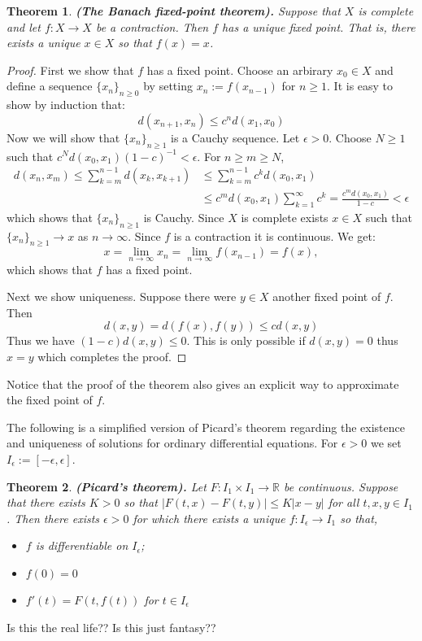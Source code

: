 \documentclass[11pt,a4paper]{article}
\theoremstyle{definition}
\theoremstyle{plain}
\newtheorem{theorem}{Theorem}[section]
\newcommand{\R}{\mathbb{R}}
\newcommand{\abs}[1]{\left\lvert #1\right\rvert}
\renewcommand{\tt}[1]{\textnormal{\textbf{(#1).}}} %
\begin{document}
	\begin{theorem}
		\tt{The Banach fixed-point theorem}
		Suppose that $X$ is complete
		and let $f \colon X \to X$ be a contraction. Then $f$ has a unique fixed 
		point. That is, there exists a unique $x \in X$ so that $f(x) = x$.
	\end{theorem}
	\begin{proof}
		First we show that $f$ has a fixed point. Choose an arbirary $x_0 \in X$
		and define a sequence $\{x_n\}_{n \geq 0}$ by setting
		$x_n := f(x_{n-1})$ for $n \geq 1$. It is easy to show by induction
		that:
		\[
			d(x_{n+1},x_{n}) \le c^n d(x_1,x_0)
		\]
		Now we will show that $\{x_n\}_{n \geq 1}$ is a Cauchy sequence.
		Let $\epsilon > 0$. Choose $N \geq 1$ such that
		$c^N d(x_0,x_1) (1-c)^{-1} < \epsilon$. For $n \geq m \geq N$,
		\begin{align*}
			d(x_n,x_m) \le 
			\sum_{k=m}^{n-1}{d(x_{k},x_{k+1})} &\le 
			\sum_{k=m}^{n-1}{c^k d(x_{0},x_{1})} \\ &\le
			c^m d(x_0,x_1) \sum_{k=1}^{\infty}{c^k} =
			\frac{c^m d(x_0,x_1)}{1-c} < \epsilon
		\end{align*}
		which shows that $\{x_n\}_{n \geq 1}$ is Cauchy. Since $X$ is complete
		exists $x \in X$ such that $\{x_n\}_{n \geq 1} \to x$ as $n \to \infty$.
		Since $f$ is a contraction it is continuous. We get:
		\[
			x = \lim_{n\to\infty}{x_n} = \lim_{n \to \infty}{f(x_{n-1})} = f(x),
		\]
		which shows that $f$ has a fixed point.
		
		Next we show uniqueness. Suppose there were $y \in X$ another fixed
		point of $f$. Then
		\[
			d(x,y) = d(f(x),f(y)) \le cd(x,y)
		\]
		Thus we have $(1-c)d(x,y) \le 0$. This is only possible if $d(x,y)=0$
		thus $x=y$ which completes the proof.
	\end{proof}
	Notice that the proof of the theorem also gives an explicit way to 
	approximate the fixed point of $f$.
	
	The following is a simplified version of Picard's theorem regarding the 
	existence and uniqueness of solutions for ordinary differential equations. 	
	For $\epsilon > 0$ we set $I_\epsilon := [-\epsilon, \epsilon]$.
	\begin{theorem}
		\tt{Picard's theorem}
		Let $F \colon I_1 \times I_1 \to \R$ be continuous. Suppose that there 
		exists $K > 0$ so that $\abs{F(t,x) - F(t,y)} \le K\abs{x - y}$ for all 
		$t, x, y \in I_1$. Then there exists $\epsilon > 0$ for which there 
		exists a unique $f \colon I_{\epsilon} \to I_{1}$ so that,
		\begin{itemize}
			\item $f$ is differentiable on $I_{\epsilon}$;
			\item $f(0)=0$
			\item $f'(t) = F(t,f(t))$ for $t \in I_{\epsilon}$
		\end{itemize}
	\end{theorem}
  Is this the real life?? Is this just fantasy??	
	\newpage
	
\end{document}
